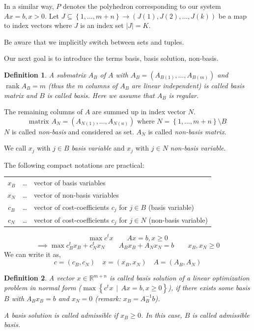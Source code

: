 \documentclass[a4paper]{article}
\numberwithin{lecref}{subsection}
\newtheorem*{Definition}{Definition}
\newcommand{\Abs}[1]{\left|#1\right|}
\newcommand{\Set}[1]{\left\{#1\right\}}
\newcommand{\SetDef}[2]{\left\{#1\,\mid\,#2\right\}}
\DeclareMathOperator{\rank}{rank}
\begin{document}
In a similar way, $P$ denotes the polyhedron corresponding to our system $Ax = b, x > 0$.
Let $J \subseteq \Set{1, \dots, m+n} \to (J(1), J(2), \dots, J(k))$ be a map to index vectors where $J$ is an index set $\Abs{J} = K$.

Be aware that we implicitly switch between sets and tuples.

Our next goal is to introduce the terms basis, basis solution, non-basis.

\begin{Definition}
  A submatrix $A_B$ of $A$ with $A_{B} = (A_{B(1)}, \dots, A_{B(m)})$ and $\rank{A_B} = m$ (thus the m columns of $A_B$ are linear independent)
  is called \emph{basis matrix} and $B$ is called \emph{basis}. Here we assume that $A_B$ is regular.
\end{Definition}

The remaining columns of $A$ are summed up in index vector $N$.
\[ \text{matrix } A_N = (A_{N(1)}, \dots, A_{N(n)}) \text{ where } N = \Set{1, \dots, m+n} \setminus B \]
$N$ is called \emph{non-basis} and considered as set. $A_N$ is called \emph{non-basis matrix}.

We call $x_j$ with $j \in B$ \emph{basis variable} and $x_j$ with $j \in N$ \emph{non-basis variable}.

The following compact notations are practical: \\
\begin{tabular}{ccl}
	$x_B$ & \dots & vector of basis variables \\
	$x_N$ & \dots & vector of non-basis variables \\
	$c_B$ & \dots & vector of cost-coefficients $c_j$ for $j \in B$ (basis variable) \\
	$c_N$ & \dots & vector of cost-coefficients $c_j$ for $j \in N$ (non-basis variable)
\end{tabular}
\[ \max c^t x \qquad Ax = b, x \geq 0 \]
\[ \implies \max c_B^t x_B + c_N^t x_N \qquad A_B x_B + A_N x_N = b \qquad x_B, x_N \geq 0 \]
We can write it as,
\[ c = (c_B, c_N) \quad x = (x_B, x_N) \quad A = (A_B, A_N) \]

\begin{Definition}
  A vector $x \in \mathbb R^{m + n}$ is called \emph{basis solution} of a linear optimization problem in normal form ($\max\SetDef{c^t x}{Ax = b, x \geq 0}$), if there exists some basis $B$ with $A_B x_B = b$ and $x_N = 0$ (remark: $x_B = A_B^{-1} b$).

  A basis solution is called \emph{admissible} if $x_B \geq 0$. In this case, $B$ is called \emph{admissible basis}.
\end{Definition}
\end{document}
